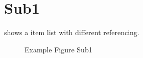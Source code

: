 \section[Sub1]{Sub1}\label{main1:sub:sub1}

 shows a item list with different referencing.

\begin{figure}[!h]
    \caption[{Main1; Sub; Sub1}]{Example Figure Sub1}
    \label{fig:main1:sub:sub1}
\end{figure}

